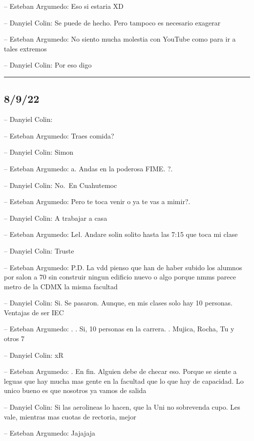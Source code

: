 -- Esteban Argumedo: Eso si estaria XD

-- Danyiel Colin: Se puede de hecho. Pero tampoco es necesario exagerar

-- Esteban Argumedo: No siento mucha molestia con YouTube como para ir a
tales extremos

-- Danyiel Colin: Por eso digo

\begin{center}\rule{0.5\linewidth}{0.5pt}\end{center}

\hypertarget{section-141}{%
\subsection{8/9/22}\label{section-141}}

-- Danyiel Colin:

-- Esteban Argumedo: Traes comida?

-- Danyiel Colin: Simon

-- Esteban Argumedo: a. Andas en la poderosa FIME. ?.

-- Danyiel Colin: No.~En Cuahutemoc

-- Esteban Argumedo: Pero te toca venir o ya te vas a mimir?.

-- Danyiel Colin: A trabajar a casa

-- Esteban Argumedo: Lel. Andare solin solito hasta las 7:15 que toca mi
clase

-- Danyiel Colin: Truste

-- Esteban Argumedo: P.D. La vdd pienso que han de haber subido los
alumnos por salon a 70 sin construir ningun edificio nuevo o algo porque
nmms parece metro de la CDMX la misma facultad

-- Danyiel Colin: Si. Se pasaron. Aunque, en mis clases solo hay 10
personas. Ventajas de ser IEC

-- Esteban Argumedo: . . Si, 10 personas en la carrera. . Mujica, Rocha,
Tu y otros 7

-- Danyiel Colin: xR

-- Esteban Argumedo: . En fin. Alguien debe de checar eso. Porque se
siente a leguas que hay mucha mas gente en la facultad que lo que hay de
capacidad. Lo unico bueno es que nosotros ya vamos de salida

-- Danyiel Colin: Si las aerolineas lo hacen, que la Uni no sobrevenda
cupo. Les vale, mientras mas cuotas de rectoria, mejor

-- Esteban Argumedo: Jajajaja

